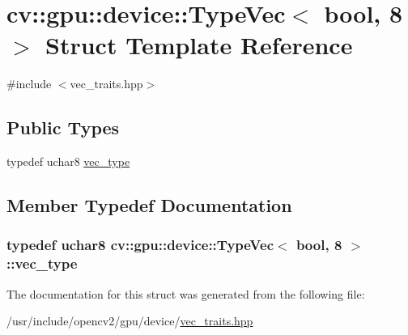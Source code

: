 \hypertarget{structcv_1_1gpu_1_1device_1_1TypeVec_3_01bool_00_018_01_4}{\section{cv\-:\-:gpu\-:\-:device\-:\-:Type\-Vec$<$ bool, 8 $>$ Struct Template Reference}
\label{structcv_1_1gpu_1_1device_1_1TypeVec_3_01bool_00_018_01_4}
}


{\ttfamily \#include $<$vec\-\_\-traits.\-hpp$>$}

\subsection*{Public Types}
\begin{DoxyCompactItemize}
\item 
typedef uchar8 \hyperlink{structcv_1_1gpu_1_1device_1_1TypeVec_3_01bool_00_018_01_4_a791f4f4130d8bdbffe5948d3d747acbb}{vec\-\_\-type}
\end{DoxyCompactItemize}


\subsection{Member Typedef Documentation}
\hypertarget{structcv_1_1gpu_1_1device_1_1TypeVec_3_01bool_00_018_01_4_a791f4f4130d8bdbffe5948d3d747acbb}{
\subsubsection[{vec\-\_\-type}]{\setlength{\rightskip}{0pt plus 5cm}typedef uchar8 {\bf cv\-::gpu\-::device\-::\-Type\-Vec}$<$ bool, 8 $>$\-::{\bf vec\-\_\-type}}}\label{structcv_1_1gpu_1_1device_1_1TypeVec_3_01bool_00_018_01_4_a791f4f4130d8bdbffe5948d3d747acbb}


The documentation for this struct was generated from the following file\-:\begin{DoxyCompactItemize}
\item 
/usr/include/opencv2/gpu/device/\hyperlink{vec__traits_8hpp}{vec\-\_\-traits.\-hpp}\end{DoxyCompactItemize}

